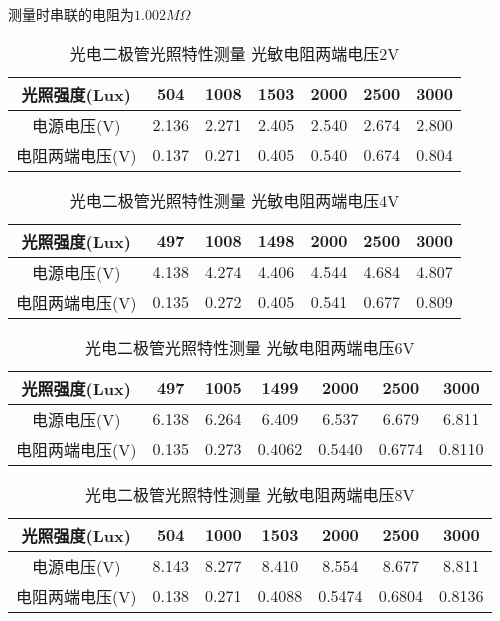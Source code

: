 \documentclass{ctexart}
\begin{document}
测量时串联的电阻为$1.002M\Omega$

\begin{table*}[!htbp]
  \centering
  \begin{tabular}{|c|c|c|c|c|c|c|}
    \hline
    光照强度(Lux) &504&1008&1503&2000&2500&3000\\\hline
    电源电压(V) &2.136&2.271&2.405&2.540&2.674&2.800\\\hline
    电阻两端电压(V) &0.137&0.271&0.405&0.540&0.674&0.804\\\hline
  \end{tabular}
  \caption{光电二极管光照特性测量 光敏电阻两端电压2V}
\end{table*}

\begin{table*}[!htbp]
  \centering
  \begin{tabular}{|c|c|c|c|c|c|c|}
    \hline
    光照强度(Lux) &497&1008&1498&2000&2500&3000\\\hline
    电源电压(V) &4.138&4.274&4.406&4.544&4.684&4.807\\\hline
    电阻两端电压(V) &0.135&0.272&0.405&0.541&0.677&0.809\\\hline
  \end{tabular}
  \caption{光电二极管光照特性测量 光敏电阻两端电压4V}
\end{table*}

\begin{table*}[!htbp]
  \centering
  \begin{tabular}{|c|c|c|c|c|c|c|}
    \hline
    光照强度(Lux) &497&1005&1499&2000&2500&3000\\\hline
    电源电压(V) &6.138&6.264&6.409&6.537&6.679&6.811\\\hline
    电阻两端电压(V) &0.135&0.273&0.4062&0.5440&0.6774&0.8110\\\hline
  \end{tabular}
  \caption{光电二极管光照特性测量 光敏电阻两端电压6V}
\end{table*}

\begin{table*}[!htbp]
  \centering
  \begin{tabular}{|c|c|c|c|c|c|c|}
    \hline
    光照强度(Lux) &504&1000&1503&2000&2500&3000\\\hline
    电源电压(V) &8.143&8.277&8.410&8.554&8.677&8.811\\\hline
    电阻两端电压(V) &0.138&0.271&0.4088&0.5474&0.6804&0.8136\\\hline
  \end{tabular}
  \caption{光电二极管光照特性测量 光敏电阻两端电压8V}
\end{table*}
\end{document}
